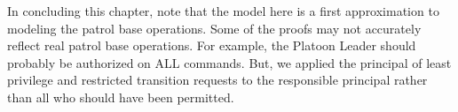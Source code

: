 \documentclass[../../main/main.tex]{subfiles}
\begin{document}
\HOLssmPlanPBTheoremsPlatoonSergeantXXtrapXXplCommandXXjustifiedXXlemma

\HOLssmPlanPBTheoremsPlatoonSergeantXXtrapXXplCommandXXjustifiedXXthm

In concluding this chapter, note that the model here is a first approximation to modeling the patrol base operations.  Some of the proofs may not accurately reflect real patrol base operations.  For example, the Platoon Leader should probably be authorized on ALL commands.  But, we applied the principal of least privilege and restricted transition requests to the responsible principal rather than all who should have been permitted.
\end{document}
